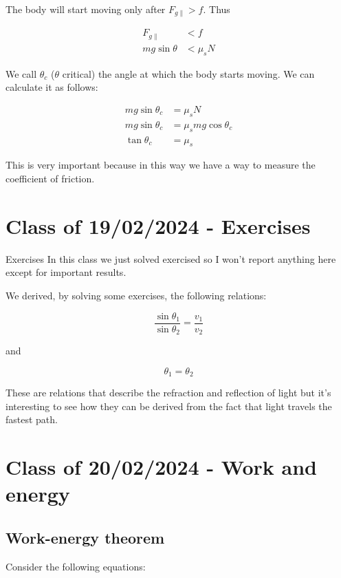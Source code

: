 \documentclass[10pt]{extarticle}
\begin{document}
The body will start moving only after $F_{g\parallel} > f$. Thus

\begin{align*}
    F_{g\parallel} & < f       \\
    mg \sin \theta & < \mu_s N
\end{align*}

We call $\theta_c$ ($\theta$ critical) the angle at which the body starts moving. We can calculate it as follows:

\begin{align*}
    mg \sin \theta_c & = \mu_s N                \\
    mg \sin \theta_c & = \mu_s mg \cos \theta_c \\
    \tan \theta_c    & = \mu_s
\end{align*}

This is very important because in this way we have a way to measure the coefficient of friction.

\section{Class of 19/02/2024 - Exercises}

\begin{warningbox}{Exercises}
    In this class we just solved exercised so I won't report anything here except for important results.
\end{warningbox}

We derived, by solving some exercises, the following relations:

$$
    \frac{\sin \theta_1}{\sin \theta_2} = \frac{v_1}{v_2}
$$

and

$$
    \theta_1 = \theta_2
$$

These are relations that describe the refraction and reflection of light but it's interesting to see how they can be derived from the fact that light travels the fastest path.

\section{Class of 20/02/2024 - Work and energy}

\subsection{Work-energy theorem}

Consider the following equations:
\end{document}
